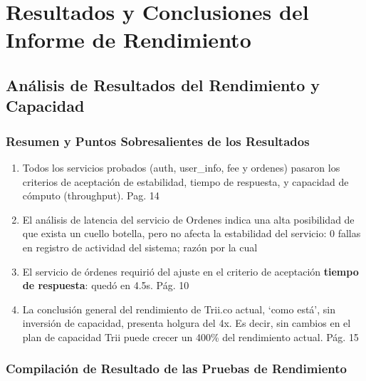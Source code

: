 \documentclass[
  paper=a4,
  ,captions=tableheading
]{scrartcl}
\providecommand{\tightlist}{%
  \setlength{\itemsep}{0pt}\setlength{\parskip}{0pt}}
\renewenvironment{quote}{\begin{customblockquote}\list{}{\rightmargin=0em\leftmargin=0em}%
\item\relax\color{blockquote-text}\ignorespaces}{\unskip\unskip\endlist\end{customblockquote}}
\begin{document}
\newpage

\section{Resultados y Conclusiones del Informe de
Rendimiento}\label{sec:resultados-y-conclusiones-del-informe-de-rendimiento}

\subsection{Análisis de Resultados del Rendimiento y
Capacidad}\label{sec:anuxe1lisis-de-resultados-del-rendimiento-y-capacidad}

\begin{quote}
\end{quote}

\subsubsection{Resumen y Puntos Sobresalientes de los
Resultados}\label{sec:resumen-y-puntos-sobresalientes-de-los-resultados}

\begin{enumerate}
\def\labelenumi{\arabic{enumi}.}
\tightlist
\item
  Todos los servicios probados (auth, user\_info, fee y ordenes) pasaron
  los criterios de aceptación de estabilidad, tiempo de respuesta, y
  capacidad de cómputo (throughput). Pag. 14
\item
  El análisis de latencia del servicio de Ordenes indica una alta
  posibilidad de que exista un cuello botella, pero no afecta la
  estabilidad del servicio: 0 fallas en registro de actividad del
  sistema; razón por la cual
\item
  El servicio de órdenes requirió del ajuste en el criterio de
  aceptación \textbf{tiempo de respuesta}: quedó en 4.5s. Pág. 10
\item
  La conclusión general del rendimiento de Trii.co actual, `como está',
  sin inversión de capacidad, presenta holgura del 4x. Es decir, sin
  cambios en el plan de capacidad Trii puede crecer un 400\% del
  rendimiento actual. Pág. 15
\end{enumerate}

\subsubsection{Compilación de Resultado de las Pruebas de
Rendimiento}\label{sec:compilaciuxf3n-de-resultado-de-las-pruebas-de-rendimiento}
\end{document}
